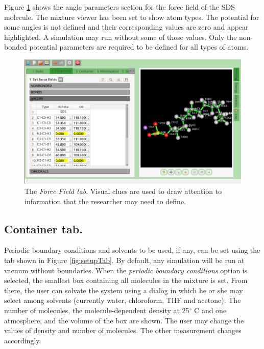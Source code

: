 \documentclass{article}
\begin{document}
Figure \ref{fig:forceTab} shows the angle parameters section for the force field of  the SDS molecule.  The mixture viewer has been set to show atom types. The potential for some angles is not defined and their corresponding values are zero and appear highlighted.  A simulation may run without some of those values.  Only the non-bonded potential parameters are required to be defined for all types of atoms.

\begin{figure}
\begin{center}
  \includegraphics[scale=0.45]{forceTab.png} 
  \caption{The \textit{Force Field tab}.  Visual clues are used to draw attention to information that the researcher may need to define.}
  \label{fig:forceTab}
\end{center}
\end{figure}


\subsection{Container tab.}

Periodic boundary conditions and solvents to be used, if any, can be set using the tab shown in Figure \ref{fig:setupTab}. By default, any simulation will be run at vacuum without boundaries. When the \textit{periodic boundary conditions} option is selected, the smallest box containing all molecules in the mixture is set. From there, the user can solvate the system using a dialog in which he or she may select among solvents (currently water, chloroform, THF and acetone). The number of molecules, the molecule-dependent density at 25$^{\circ}$ C and one atmosphere, and the volume of the box are shown. The user may change the values of density and number of molecules.  The other measurement changes accordingly.
\end{document}
